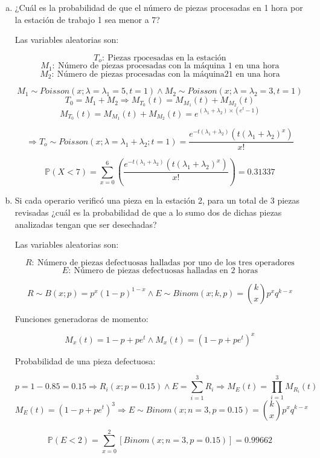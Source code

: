 \documentclass[../main.tex]{subfiles}
\begin{document}
\begin{enumerate}[(a)]

\item ¿Cuál es la probabilidad de que el número de piezas procesadas en 1
hora por la estación de trabajo 1 sea menor a 7?

Las variables aleatorias son:

$$T_o: \ \text{Piezas rpocesadas en la estación}$$
$$M_1: \ \text{Número de piezas procesadas con la máquina 1 en una hora}$$
$$M_2: \ \text{Número de piezas procesadas con la máquina21 en una hora}$$

$$M_1 \sim Poisson(x; \lambda = \lambda_1 = 5, t = 1) \wedge M_2 \sim Poisson(x; \lambda = \lambda_2 = 3, t = 1)$$
$$T_0 = M_1 + M_2 \Rightarrow M_{T_{0}}(t) = M_{M_{1}}(t) + M_{M_{2}}(t)$$
$$M_{T_{0}}(t) = M_{M_{1}}(t) + M_{M_{2}}(t) = e^{(\lambda_1 + \lambda_2) \times (e^t - 1)}$$

$$\Rightarrow T_o \sim Poisson(x; \lambda = \lambda_1 + \lambda_2; t = 1) = \frac{e^{-t(\lambda_1 + \lambda_2)}(t(\lambda_1 + \lambda_2)^x)}{x!}$$

$$\mathbb{P}(X < 7) = \sum_{x = 0}^{6} \left( \frac{e^{-t(\lambda_1 + \lambda_2)}(t(\lambda_1 + \lambda_2)^x)}{x!}\right) = 0.31337$$

\item Si cada operario verificó una pieza en la estación 2, para un total de 3
piezas revisadas ¿cuál es la probabilidad de que a lo sumo dos de dichas piezas
analizadas tengan que ser desechadas?

Las variables aleatorias son:

$$R: \ \text{Número de piezas defectuosas halladas por uno de los tres operadores}$$
$$E: \ \text{Número de piezas defectuosas halladas en 2 horas}$$

$$R \sim B(x; p) = p^x(1-p)^{1-x} \wedge E \sim Binom(x; k, p) = \binom{k}{x}p^xq^{k - x}$$

Funciones generadoras de momento:

$$M_{x}(t) = 1 - p + pe^t \wedge M_{x}(t) = (1 - p + pe^t)^x$$

Probabilidad de una pieza defectuosa:

$$p = 1 - 0.85 = 0.15 \Rightarrow R_{i}(x; p = 0.15) \wedge E = \sum_{i = 1}^{3}R_{i} \Rightarrow M_{E}(t) = \prod_{i  = 1}^{3} M_{R_{i}}(t)$$
$$M_{E}(t) = (1 - p + pe^t)^3 \Rightarrow E \sim Binom(x; n = 3, p = 0.15) = \binom{k}{x}p^xq^{k - x}$$

$$\mathbb{P}(E < 2) = \sum_{x = 0}^{2} \left[ Binom(x; n = 3, p = 0.15) \right] = 0.99662$$


\end{enumerate}
\end{document}
